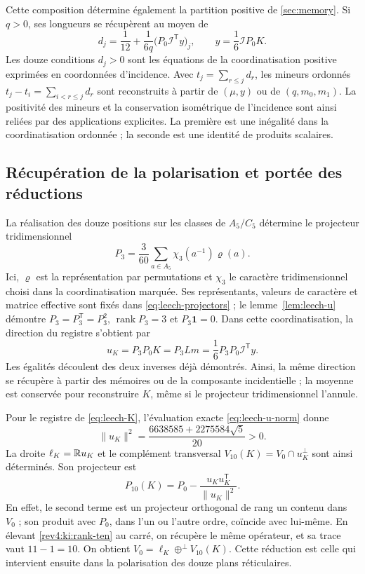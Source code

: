 Cette composition détermine également la partition positive de \ref{sec:memory}. Si \(q>0\), ses longueurs se récupèrent au moyen de
\begin{equation}
 d_j=\frac1{12}+\frac{1}{6q}
             \bigl(P_0\mathcal I^{\mathsf T}y\bigr)_j,
 \qquad y=\frac16\mathcal I P_0K.
 \label{rev4:ki:positive-lengths}
\end{equation}
Les douze conditions \(d_j>0\) sont les équations de la coordinatisation positive exprimées en coordonnées d'incidence. Avec \(t_j=\sum_{r\leq j}d_r\), les mineurs ordonnés \(t_j-t_i=\sum_{i<r\leq j}d_r\) sont reconstruits à partir de \((\mu,y)\) ou de \((q,m_0,m_1)\). La positivité des mineurs et la conservation isométrique de l'incidence sont ainsi reliées par des applications explicites. La première est une inégalité dans la coordinatisation ordonnée ; la seconde est une identité de produits scalaires.

\subsection{Récupération de la polarisation et portée des réductions}
\label{rev4:ki:direction-subsection}

La réalisation des douze positions sur les classes de
\(A_5/C_5\) détermine le projecteur tridimensionnel
\[
 P_3=\frac3{60}\sum_{a\in A_5}
               \chi_3(a^{-1})\varrho(a).
\]
Ici, \(\varrho\) est la représentation par permutations et \(\chi_3\) le caractère tridimensionnel choisi dans la coordinatisation marquée. Ses représentants, valeurs de caractère et matrice effective sont fixés dans \eqref{eq:leech-projectors} ; le lemme~\ref{lem:leech-u} démontre \(P_3=P_3^{\mathsf T}=P_3^2\), \(\operatorname{rank}P_3=3\) et \(P_3\mathbf1=0\). Dans cette coordinatisation, la direction du registre s'obtient par
\begin{equation}
 u_K=P_3P_0K=P_3Lm
     =\frac16P_3P_0\mathcal I^{\mathsf T}y.
 \label{rev4:ki:direction-reconstruction}
\end{equation}
Les égalités découlent des deux inverses déjà démontrés. Ainsi,
la même direction se récupère à partir des mémoires ou de la
composante incidentielle ; la moyenne est conservée pour reconstruire
\(K\), même si le projecteur tridimensionnel l’annule.

Pour le registre de \eqref{eq:leech-K}, l’évaluation exacte
\eqref{eq:leech-u-norm} donne
\[
 \|u_K\|^2=
       \frac{6638585+2275584\sqrt5}{20}>0.
\]
La droite \(\ell_K=\mathbb R u_K\) et le complément transversal
\(V_{10}(K)=V_0\cap u_K^\perp\) sont ainsi déterminés.
Son projecteur est
\begin{equation}
 P_{10}(K)=P_0-
       \frac{u_Ku_K^{\mathsf T}}{\|u_K\|^2}.
 \label{rev4:ki:rank-ten}
\end{equation}
En effet, le second terme est un projecteur orthogonal de rang un contenu dans \(V_0\) ; son produit avec \(P_0\), dans l'un ou l'autre ordre, coïncide avec lui-même. En élevant \eqref{rev4:ki:rank-ten} au carré, on récupère le même opérateur, et sa trace vaut \(11-1=10\). On obtient \(V_0=\ell_K\oplus^\perp V_{10}(K)\). Cette réduction est celle qui intervient ensuite dans la polarisation des douze plans réticulaires.

